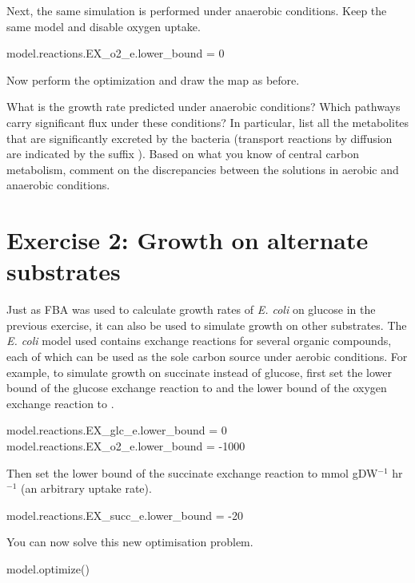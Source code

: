 \noindent Next, the same simulation is performed under anaerobic conditions.
Keep the same model and disable oxygen uptake.
\begin{code-python}
model.reactions.EX_o2_e.lower_bound = 0
\end{code-python}
Now perform the optimization and draw the map as before.

\begin{questions}
\setcounter{question}{2}
\question What is the growth rate predicted under anaerobic conditions?
Which pathways carry significant flux under these conditions?
In particular, list all the metabolites that are significantly excreted by the bacteria (transport reactions by diffusion are indicated by the suffix ).
Based on what you know of central carbon metabolism, comment on the discrepancies between the solutions in aerobic and anaerobic conditions.
\begin{solutionorbox}[6cm]

\end{solutionorbox}
\end{questions}

\section*{Exercise 2: Growth on alternate substrates}
\setcounter{section}{2}

Just as FBA was used to calculate growth rates of \textit{E. coli} on glucose in the previous exercise, it can also be used to simulate growth on other substrates.
The \textit{E. coli} model used contains exchange reactions for several organic compounds, each of which can be used as the sole carbon source under aerobic conditions.
For example, to simulate growth on succinate instead of glucose, first set the lower bound of the glucose exchange reaction  to  and the lower bound of the oxygen exchange reaction to .
\begin{code-python}
model.reactions.EX_glc_e.lower_bound = 0
model.reactions.EX_o2_e.lower_bound = -1000
\end{code-python}
Then set the lower bound of the succinate exchange reaction  to  mmol gDW$^{-1}$ hr$^{-1}$ (an arbitrary uptake rate).
\begin{code-python}
model.reactions.EX_succ_e.lower_bound = -20
\end{code-python}
You can now solve this new optimisation problem.
\begin{code-python}
model.optimize()
\end{code-python}

